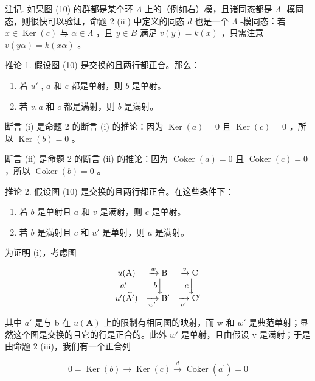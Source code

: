 注记. 如果图 (10) 的群都是某个环 \(\Lambda\) 上的（例如右）模，且诸同态都是 \(\Lambda\) -模同态，则很快可以验证，命题 2 (iii) 中定义的同态 \(d\) 也是一个 \(\Lambda\) -模同态：若 \(x \in \operatorname{Ker}(c)\) 与 \(\alpha \in \Lambda\) ，且 \(y \in B\) 满足 \(v(y) = k(x)\) ，只需注意 \(v(y\alpha) = k(x\alpha)\) 。

推论 1. 假设图 (10) 是交换的且两行都正合。那么：

\begin{enumerate}
\def\labelenumi{(\roman{enumi})}
\item
  若 \(u'\) , \(a\) 和 \(c\) 都是单射，则 \(b\) 是单射。
\item
  若 \(v, a\) 和 \(c\) 都是满射，则 \(b\) 是满射。
\end{enumerate}

断言 (i) 是命题 2 的断言 (i) 的推论：因为 \(\operatorname{Ker}(a) = 0\) 且 \(\operatorname{Ker}(c) = 0\) ，所以 \(\operatorname{Ker}(b) = 0\) 。

断言 (ii) 是命题 2 的断言 (ii) 的推论：因为 \(\operatorname{Coker}(a) = 0\) 且 \(\operatorname{Coker}(c) = 0\) ，所以 \(\operatorname{Coker}(b) = 0\) 。

推论 2. 假设图 (10) 是交换的且两行都正合。在这些条件下：

\begin{enumerate}
\def\labelenumi{(\roman{enumi})}
\item
  若 \(b\) 是单射且 \(a\) 和 \(v\) 是满射，则 \(c\) 是单射。
\item
  若 \(b\) 是满射且 \(c\) 和 \(u'\) 是单射，则 \(a\) 是满射。
\end{enumerate}

为证明 (i)，考虑图

\[
\begin{array}{c c c} u (\mathrm{A}) & \xrightarrow {w} \mathrm{B} & \xrightarrow {v} \mathrm{C} \\ a ^ {\prime} \Big \downarrow & b \Big \downarrow & c \Big \downarrow \\ u ^ {\prime} (\mathrm{A} ^ {\prime}) & \xrightarrow [ w ^ {\prime} ]{} \mathrm{B} ^ {\prime} & \xrightarrow [ v ^ {\prime} ]{} \mathrm{C} ^ {\prime} \end{array}
\]

其中 \(a'\) 是与 b 在 \(u(\mathbf{A})\) 上的限制有相同图的映射，而 w 和 \(w'\) 是典范单射；显然这个图是交换的且它的行是正合的。此外 \(w'\) 是单射，且由假设 v 是满射；于是由命题 2 (iii)，我们有一个正合列

\[
0 = \operatorname{Ker} (b) \longrightarrow \operatorname{Ker} (c) \stackrel {d} {\longrightarrow} \operatorname{Coker} (a ^ {\prime}) = 0
\]


